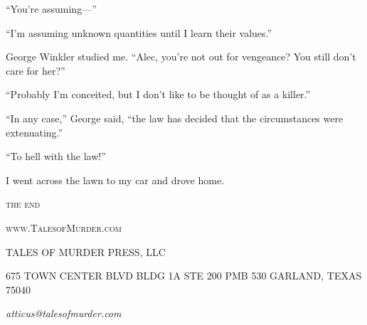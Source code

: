 \documentclass{novel}
\begin{document}
{“You’re assuming—”

“I’m assuming unknown quantities until I learn their values.”

George Winkler studied me. “Alec, you’re not out for vengeance? You still don’t care for her?”

“Probably I’m conceited, but I don’t like to be thought of as a killer.”

“In any case,” George said, “the law has decided that the circumstances were extenuating.”

“To hell with the law!”

I went across the lawn to my car and drove home.

}

\vspace{2\nbs}
\clearpage
\thispagestyle{empty}


\scenebreak
\scenebreak
{\centering\textsc{the end}\par}

\clearpage

\null

\centering\textsc{www.TalesofMurder.com}\par

\vspace*{10\nbs}


TALES OF MURDER PRESS, LLC

\null

\scshape{675 TOWN CENTER BLVD
BLDG 1A STE 200 PMB 530
GARLAND, TEXAS 75040}

\null

\textit{atticus@talesofmurder.com}
\vfill
\end{document}
